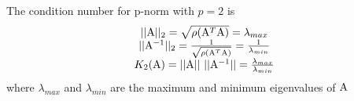 \begin{example}
    The condition number for p-norm with $p = 2$ is
    $$
        \begin{matrix}
            ||\mathrm{A}||_2 = \sqrt{\rho(\mathrm{A}^T\mathrm{A})} = \lambda_{max}\\
            ||\mathrm{A}^{-1}||_2 = \frac{1}{\sqrt{\rho(\mathrm{A}^T\mathrm{A})}} = \frac{1}{\lambda_{min}}\\
            K_2(\mathrm{A}) = ||\mathrm{A}||\ ||\mathrm{A}^{-1}|| = \frac{\lambda_{max}}{\lambda_{min}}
        \end{matrix}
    $$
    where $\lambda_{max}$ and $\lambda_{min}$ are the maximum and minimum eigenvalues of $\mathrm{A}$
\end{example}